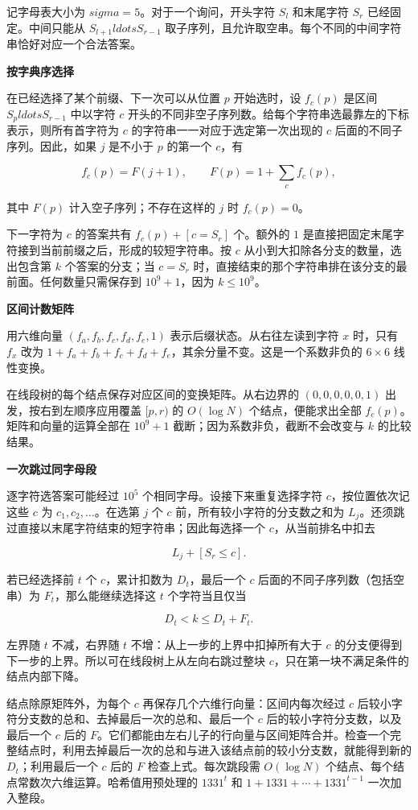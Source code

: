 \Legend
记字母表大小为 $sigma=5$。对于一个询问，开头字符 $S_l$ 和末尾字符 $S_r$ 已经固定。中间只能从 $S_{l+1}ldots S_{r-1}$ 取子序列，且允许取空串。每个不同的中间字符串恰好对应一个合法答案。

\textbf{按字典序选择}

在已经选择了某个前缀、下一次可以从位置 $p$ 开始选时，设 $f_c(p)$ 是区间 $S_pldots S_{r-1}$ 中以字符 $c$ 开头的不同非空子序列数。给每个字符串选最靠左的下标表示，则所有首字符为 $c$ 的字符串一一对应于选定第一次出现的 $c$ 后面的不同子序列。因此，如果 $j$ 是不小于 $p$ 的第一个 $c$，有

$$f_c(p)=F(j+1),\qquad F(p)=1+\sum_c f_c(p),$$

其中 $F(p)$ 计入空子序列；不存在这样的 $j$ 时 $f_c(p)=0$。

下一字符为 $c$ 的答案共有 $f_c(p)+[c=S_r]$ 个。额外的 $1$ 是直接把固定末尾字符接到当前前缀之后，形成的较短字符串。按 $c$ 从小到大扣除各分支的数量，选出包含第 $k$ 个答案的分支；当 $c=S_r$ 时，直接结束的那个字符串排在该分支的最前面。任何数量只需保存到 $10^9+1$，因为 $k\le10^9$。

\textbf{区间计数矩阵}

用六维向量 $(f_a,f_b,f_c,f_d,f_e,1)$ 表示后缀状态。从右往左读到字符 $x$ 时，只有 $f_x$ 改为 $1+f_a+f_b+f_c+f_d+f_e$，其余分量不变。这是一个系数非负的 $6\times6$ 线性变换。

在线段树的每个结点保存对应区间的变换矩阵。从右边界的 $(0,0,0,0,0,1)$ 出发，按右到左顺序应用覆盖 $[p,r)$ 的 $O(\log N)$ 个结点，便能求出全部 $f_c(p)$。矩阵和向量的运算全部在 $10^9+1$ 截断；因为系数非负，截断不会改变与 $k$ 的比较结果。

\textbf{一次跳过同字母段}

逐字符选答案可能经过 $10^5$ 个相同字母。设接下来重复选择字符 $c$，按位置依次记这些 $c$ 为 $c_1,c_2,\ldots$。在选第 $j$ 个 $c$ 前，所有较小字符的分支数之和为 $L_j$。还须跳过直接以末尾字符结束的短字符串；因此每选择一个 $c$，从当前排名中扣去

$$L_j+[S_r\le c].$$

若已经选择前 $t$ 个 $c$，累计扣数为 $D_t$，最后一个 $c$ 后面的不同子序列数（包括空串）为 $F_t$，那么能继续选择这 $t$ 个字符当且仅当

$$D_t<k\le D_t+F_t.$$

左界随 $t$ 不减，右界随 $t$ 不增：从上一步的上界中扣掉所有大于 $c$ 的分支便得到下一步的上界。所以可在线段树上从左向右跳过整块 $c$，只在第一块不满足条件的结点内部下降。

结点除原矩阵外，为每个 $c$ 再保存几个六维行向量：区间内每次经过 $c$ 后较小字符分支数的总和、去掉最后一次的总和、最后一个 $c$ 后的较小字符分支数，以及最后一个 $c$ 后的 $F$。它们都能由左右儿子的行向量与区间矩阵合并。检查一个完整结点时，利用去掉最后一次的总和与进入该结点前的较小分支数，就能得到新的 $D_t$；利用最后一个 $c$ 后的 $F$ 检查上式。每次跳段需 $O(\log N)$ 个结点、每个结点常数次六维运算。哈希值用预处理的 $1331^t$ 和 $1+1331+\cdots+1331^{t-1}$ 一次加入整段。

